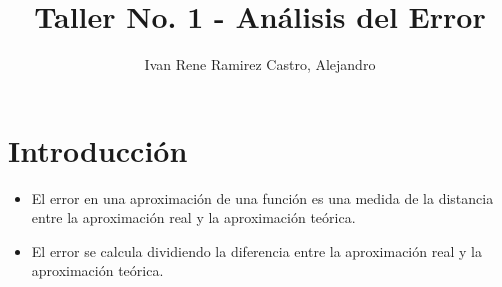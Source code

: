 \documentclass{article}
\title{Taller No. 1 - Análisis del Error}
\author{Ivan Rene Ramirez Castro, Alejandro}
\begin{document}
\maketitle
\section{Introducción}
\begin{itemize}
\item El error en una aproximación de una función es una medida de la distancia entre la aproximación real y la aproximación teórica.
\item El error se calcula dividiendo la diferencia entre la aproximación real y la aproximación teórica.
\end{itemize}
\end{document}
